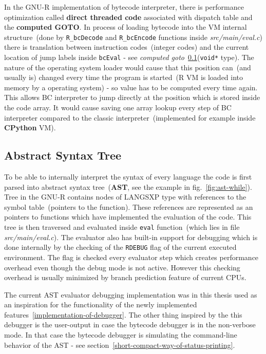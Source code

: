 \documentclass[thesis=M,english]{FITthesis}[2018/10/20]
\newcommand{\code}[1]{\texttt{#1}}
\begin{document}
In the GNU-R implementation of bytecode interpreter, there is performance optimization called \textbf{direct threaded code}  associated with dispatch table and the \textbf{computed GOTO}. In process of loading bytecode into the VM internal structure~(done by \code{R{\_}bcDecode} and \code{R{\_}bcEncode} functions inside \textit{src/main/eval.c}) there is translation between instruction codes~(integer codes) and the current location of jump labels inside \code{bcEval} - see \textit{computed goto}~\ref{AST}(\code{void*} type). The nature of the operating system loader would cause that this position can~(and usually is) changed every time the program is started~(R VM is loaded into memory by a operating system) - so value has to be computed every time again. This allows BC interpreter to jump directly at the position which is stored inside the code array. It would cause saving one array lookup every step of BC interpreter compared to the classic interpreter~(implemented for example inside \textbf{CPython} VM).

\subsection{Abstract Syntax Tree}\label{AST}

To be able to internally interpret the syntax of every language the code is first parsed into abstract syntax tree~(\textbf{AST}, see the example in fig.~\ref{fig:ast-while}). Tree in the GNU-R contains nodes of LANGSXP type with references to the symbol table~(pointers to the function). These references are represented as an pointers to functions which have implemented the evaluation of the code. This tree is then traversed and evaluated inside \code{eval} function~(which lies in file \textit{src/main/eval.c}). The evaluator also has built-in support for debugging which is done internally by the checking of the \code{RDEBUG} flag of the current executed environment. The flag is checked every evaluator step which creates performance overhead even though the debug mode is not active. However this checking overhead is usually minimized by branch prediction feature of current CPUs. 

The current AST evaluator debugging implementation was in this thesis used as an inspiration for the functionality of the newly implemented features~\ref{implementation-of-debugger}. The other thing inspired by the this debugger is the user-output in case the bytecode debugger is in the non-verbose mode. In that case the bytecode debugger is simulating the command-line behavior of the AST - see section~\ref{short-compact-way-of-status-printing}.
\end{document}
